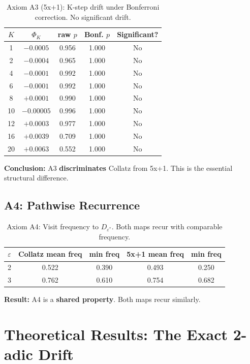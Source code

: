 \documentclass[11pt,a4paper]{article}
\theoremstyle{plain}
\theoremstyle{definition}
\theoremstyle{remark}
\begin{document}
\begin{table}[H]
\centering
\caption{Axiom A3 (5x+1): K-step drift under Bonferroni correction. No significant drift.}
\label{tab:a3_fivexone}
\begin{tabular}{c|cccc}
\toprule
$K$ & $\Phi_K$ & raw $p$ & Bonf. $p$ & Significant? \\
\midrule
1 & $-0.0005$ & 0.956 & 1.000 & No \\
2 & $-0.0004$ & 0.965 & 1.000 & No \\
4 & $-0.0001$ & 0.992 & 1.000 & No \\
6 & $-0.0001$ & 0.992 & 1.000 & No \\
8 & $+0.0001$ & 0.990 & 1.000 & No \\
10 & $-0.00005$ & 0.996 & 1.000 & No \\
12 & $+0.0003$ & 0.977 & 1.000 & No \\
16 & $+0.0039$ & 0.709 & 1.000 & No \\
20 & $+0.0063$ & 0.552 & 1.000 & No \\
\bottomrule
\end{tabular}
\end{table}

\textbf{Conclusion:} A3 \textbf{discriminates} Collatz from 5x+1. This is the essential structural difference.

\subsection{A4: Pathwise Recurrence}

\begin{table}[h]
\centering
\caption{Axiom A4: Visit frequency to $D_{\varepsilon^*}$. Both maps recur with comparable frequency.}
\label{tab:a4}
\begin{tabular}{c|cc|cc}
\toprule
$\varepsilon$ & Collatz mean freq & min freq & 5x+1 mean freq & min freq \\
\midrule
2 & 0.522 & 0.390 & 0.493 & 0.250 \\
3 & 0.762 & 0.610 & 0.754 & 0.682 \\
\bottomrule
\end{tabular}
\end{table}

\textbf{Result:} A4 is a \textbf{shared property}. Both maps recur similarly.

\section{Theoretical Results: The Exact 2-adic Drift}
\label{sec:theory}
\end{document}

